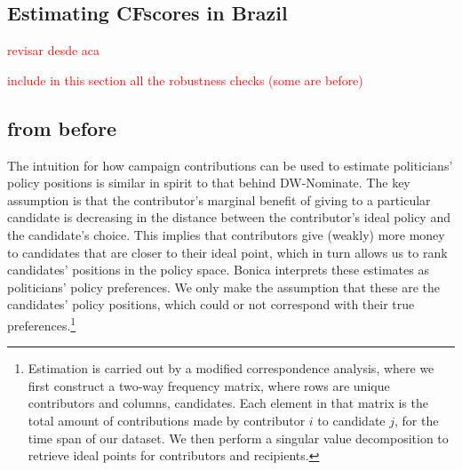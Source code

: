 \documentclass[12pt,english]{article}
\numberwithin{equation}{section}
\theoremstyle{plain}
\theoremstyle{remark}
\theoremstyle{plain}
\newcommand{\red}[1]{\textcolor{red}{#1}}
\begin{document}
\subsection{Estimating CFscores in Brazil}

\bigskip \Large 
\red{revisar desde aca}
\bigskip \normalsize

\red{include in this section all the robustness checks (some are before)}

\subsection{from before}

The intuition for how campaign contributions can be used to estimate politicians' policy positions is similar in spirit to that behind DW-Nominate. %
 The key assumption is that the contributor's marginal benefit of giving to a particular candidate is decreasing in the distance between the contributor's ideal policy and the candidate's choice. This implies that contributors give (weakly) more money to candidates that are closer to their ideal point, which in turn allows us to rank candidates' positions in the policy space. Bonica interprets these estimates as politicians' policy preferences. We only make the assumption that these are the candidates' policy positions, which could or not correspond with their true preferences.\footnote{Estimation is carried out by a modified correspondence analysis, where we first construct a two-way frequency matrix, where rows are unique contributors and columns, candidates. Each element in that matrix is the total amount of contributions made by contributor $i$ to candidate $j$, for the time span of our dataset. We then perform a singular value decomposition to retrieve ideal points for contributors and recipients.}  
 
\end{document}
